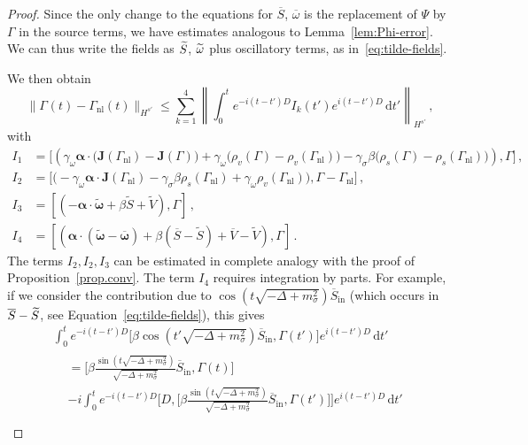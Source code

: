 \documentclass[AHL,Unicode,longabstracts,published]{cedram}
\newcommand{\rmin}{\mathrm{in}}
\newcommand{\nl}{\mathrm{nl}}
\renewcommand\tilde{\widetilde}
\renewcommand\d[1]{{\ensuremath{\,\text{d}#1}}}
\let\oldtilde\tilde
\renewcommand*{\tilde}[1]{\mathchoice{\widetilde{#1}}{\widetilde{#1}}{\oldtilde{#1}}{\oldtilde{#1}}}
\begin{document}
\begin{proof}
Since the only change to the equations for $\overline{S}$, $\overline{\omega}$ is the replacement of $\Psi$ by $\Gamma$ in the source terms, we have estimates analogous to Lemma~\ref{lem:Phi-error}. We can thus write the fields as $\tilde S$, $\tilde \omega$ plus oscillatory terms, as in~\eqref{eq:tilde-fields}.

We then obtain
\begin{equation}\label{eq:Gamma diff}
\|\Gamma_{}(t) -\Gamma_{\nl}(t) \|_{H^{s'}}\leq \sum_{k=1}^4\left\|\int_0^te^{-i(t-t')D}I_k (t')e^{i(t-t')D}\d t'\right\|_{H^{s'}}\,,
\end{equation}
with
\begin{align*}
I_1&= \Big[\left(
\gamma_\omega {\bm\alpha}\cdot \big({\bm J}(\Gamma_\nl) -{\bm J}(\Gamma)\big) +\gamma_\omega\big(\rho_v(\Gamma) - \rho_v(\Gamma_{\nl})\big) -\gamma_\sigma \beta\big(\rho_s(\Gamma) - \rho_s(\Gamma_{\nl})\big)
\right),\Gamma\Big]\,,\\
I_2&= \Big[\big(-\gamma_\omega{\bm\alpha}\cdot {\bm J}(\Gamma_\nl)-\gamma_\sigma\beta \rho_s(\Gamma_{\nl})+\gamma_\omega\rho_v(\Gamma_{\nl})\big),\Gamma-\Gamma_\nl \Big] \,,
\\
I_3&=
\left[\left(-\bm\alpha\cdot \widetilde{\bm \omega}+\beta \widetilde{S}+\widetilde{V}\right),\Gamma\right]\,,
\\
I_4&=\left[\left(\bm\alpha\cdot (\widetilde{\bm \omega}-\overline{{\bm \omega}})+\beta(\overline{S}-\widetilde{S})+\overline{V}-\widetilde{V}\right),\Gamma\right]\,.
\end{align*}
The terms $I_2, I_2, I_3$ can be estimated in complete analogy with the proof of Proposition~\ref{prop.conv}. The term $I_4$ requires integration by parts. For example, if we consider the contribution due to $\cos(t\sqrt{-\Delta + m^2_\sigma})\overline{S}_\rmin$ (which occurs in $\overline{S}-\tilde S$, see Equation~\eqref{eq:tilde-fields}), this gives
\begin{multline*}
\int_0^t e^{-i(t-t')D}\Big[\beta \cos\left(t'\sqrt{-\Delta + m^2_\sigma}\right)\overline{S}_\rmin, \Gamma(t')\Big]e^{i(t-t')D}\d t'\\
\begin{aligned}
&= \Big[\beta \frac{\sin\left(t\sqrt{-\Delta + m^2_\sigma}\right)}{\sqrt{-\Delta + m^2_\sigma}} \overline{S}_\rmin, \Gamma(t) \Big] \\
&- i\int_0^t e^{-i(t-t')D}\Big[D,\Big[\beta \frac{\sin\left(t\sqrt{-\Delta + m^2_\sigma}\right)}{\sqrt{-\Delta + m^2_\sigma}}\overline{S}_\rmin, \Gamma(t')\Big]\Big]e^{i(t-t')D}\d t' \\

\end{aligned}
\end{multline*}
\end{proof}
\end{document}
